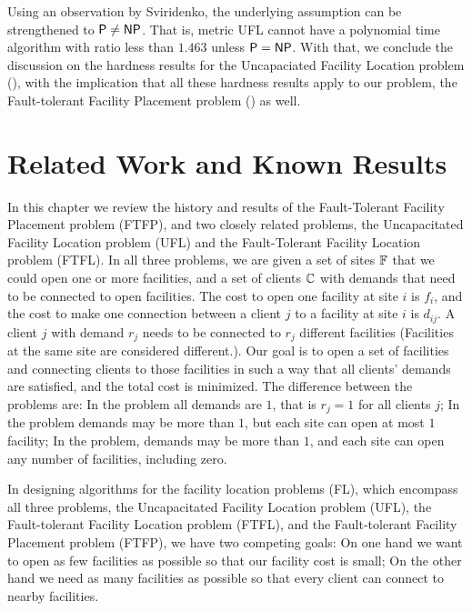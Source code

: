 \documentclass[oneside,final]{ucr}
\begin{document}
Using an observation by Sviridenko, the underlying
assumption can be strengthened to ${\mbox{\sf P}} \neq {\mbox{\sf NP}}$. That is,
metric UFL cannot have a polynomial time algorithm with
ratio less than $1.463$ unless ${\mbox{\sf P}} = {\mbox{\sf NP}}$. With that, we
conclude the discussion on the hardness results for the
Uncapaciated Facility Location problem ({\UFL}), with the
implication that all these hardness results apply to our
problem, the Fault-tolerant Facility Placement problem
(\FTFP) as well.

\chapter{Related Work and Known Results} \label{ch: related_work}

In this chapter we review the history and results of the
Fault-Tolerant Facility Placement problem (FTFP), and two
closely related problems, the Uncapacitated Facility
Location problem (UFL) and the Fault-Tolerant Facility
Location problem (FTFL). In all three problems, we are given
a set of sites $\mathbb{F}$ that we could open one or more
facilities, and a set of clients $\mathbb{C}$ with demands
that need to be connected to open facilities. The cost to
open one facility at site $i$ is $f_i$, and the cost to make
one connection between a client $j$ to a facility at site
$i$ is $d_{ij}$. A client $j$ with demand $r_j$ needs to be
connected to $r_j$ different facilities (Facilities at the
same site are considered different.). Our goal is to open a
set of facilities and connecting clients to those facilities
in such a way that all clients' demands are satisfied, and
the total cost is minimized. The difference between the
problems are: In the {\UFL} problem all demands are $1$,
that is $r_j=1$ for all clients $j$; In the {\FTFL} problem
demands may be more than $1$, but each site can open at most
$1$ facility; In the {\FTFP} problem, demands may be more
than $1$, and each site can open any number of facilities,
including zero.

In designing algorithms for the facility location problems
(FL), which encompass all three problems, the Uncapacitated
Facility Location problem (UFL), the Fault-tolerant Facility
Location problem (FTFL), and the Fault-tolerant Facility
Placement problem (FTFP), we have two competing goals: On
one hand we want to open as few facilities as possible so
that our facility cost is small; On the other hand we need
as many facilities as possible so that every client can
connect to nearby facilities.
\end{document}
